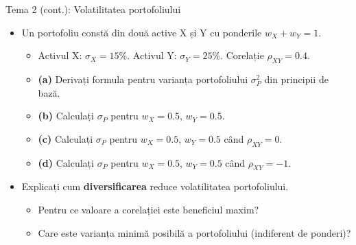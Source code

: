 \documentclass[9pt, aspectratio=169, t]{beamer}
\theoremstyle{definition}
\begin{document}
\begin{frame}{Tema 2 (cont.): Volatilitatea portofoliului}
\begin{itemize}
    \item Un portofoliu constă din două active X și Y cu ponderile $w_X + w_Y = 1$.
    \begin{itemize}
        \item Activul X: $\sigma_X = 15\%$. \quad Activul Y: $\sigma_Y = 25\%$. \quad Corelație $\rho_{XY} = 0.4$.
        \item \textbf{(a)} Derivați formula pentru varianța portofoliului $\sigma_P^2$ din principii de bază.
        \item \textbf{(b)} Calculați $\sigma_P$ pentru $w_X = 0.5$, $w_Y = 0.5$.
        \item \textbf{(c)} Calculați $\sigma_P$ pentru $w_X = 0.5$, $w_Y = 0.5$ când $\rho_{XY} = 0$.
        \item \textbf{(d)} Calculați $\sigma_P$ pentru $w_X = 0.5$, $w_Y = 0.5$ când $\rho_{XY} = -1$.
    \end{itemize}
    \item Explicați cum \textbf{diversificarea} reduce volatilitatea portofoliului.
    \begin{itemize}
        \item Pentru ce valoare a corelației este beneficiul maxim?
        \item Care este varianța minimă posibilă a portofoliului (indiferent de ponderi)?
    \end{itemize}
\end{itemize}
\end{frame}
\end{document}
